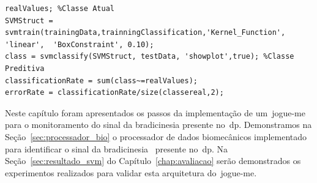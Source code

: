\begin{lstlisting}[frame=single, caption=Uso de Máquina de Vetor de Suporte para Classificação dos Dados, label=code:classification]
realValues; %Classe Atual
SVMStruct = svmtrain(trainingData,trainningClassification,'Kernel_Function', 'linear',	'BoxConstraint', 0.10);
class = svmclassify(SVMStruct, testData, 'showplot',true); %Classe Preditiva
classificationRate = sum(class~=realValues);
errorRate = classificationRate/size(classereal,2);
\end{lstlisting}

Neste capítulo foram apresentados os passos da implementação de um~\ac{jogue-me} para o monitoramento do sinal da bradicinesia presente no~\ac{dp}. Demonstramos na Seção~\ref{sec:processador_bio} o processador de dados biomecânicos implementado para identificar o sinal da bradicinesia~\cite{protpar010} presente no~\ac{dp}. Na Seção~\ref{sec:resultado_svm} do Capítulo~\ref{chap:avaliacao} serão demonstrados os experimentos realizados para validar esta arquitetura do~\ac{jogue-me}.

